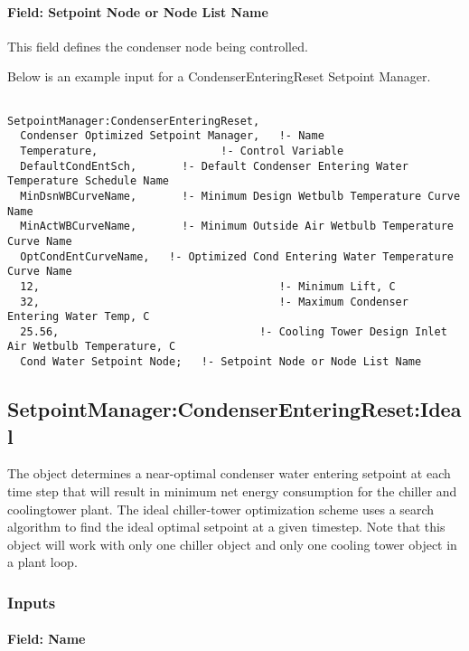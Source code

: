 \paragraph{Field: Setpoint Node or Node List Name}\label{field-setpoint-node-or-node-list-name}

This field defines the condenser node being controlled.

Below is an example input for a CondenserEnteringReset Setpoint Manager.

\begin{lstlisting}

SetpointManager:CondenserEnteringReset,
  Condenser Optimized Setpoint Manager,   !- Name
  Temperature,                   !- Control Variable
  DefaultCondEntSch,       !- Default Condenser Entering Water Temperature Schedule Name
  MinDsnWBCurveName,       !- Minimum Design Wetbulb Temperature Curve Name
  MinActWBCurveName,       !- Minimum Outside Air Wetbulb Temperature Curve Name
  OptCondEntCurveName,   !- Optimized Cond Entering Water Temperature Curve Name
  12,                                     !- Minimum Lift, C
  32,                                     !- Maximum Condenser Entering Water Temp, C
  25.56,                               !- Cooling Tower Design Inlet Air Wetbulb Temperature, C
  Cond Water Setpoint Node;   !- Setpoint Node or Node List Name
\end{lstlisting}

\subsection{SetpointManager:CondenserEnteringReset:Ideal}\label{setpointmanagercondenserenteringresetideal}

The object determines a near-optimal condenser water entering setpoint at each time step that will result in minimum net energy consumption for the chiller and coolingtower plant. The ideal chiller-tower optimization scheme uses a search algorithm to find the ideal optimal setpoint at a given timestep. Note that this object will work with only one chiller object and only one cooling tower object in a plant loop.

\subsubsection{Inputs}\label{inputs-24-002}

\paragraph{Field: Name}\label{field-name-24-001}

